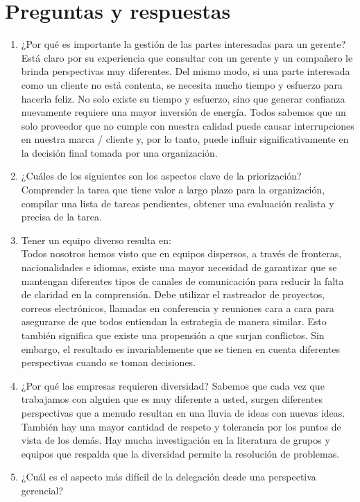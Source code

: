 \documentclass[10pt]{book}
\begin{document}
\section{Preguntas y respuestas}
\begin{enumerate}[\bfseries 1.]
\item ¿Por qué es importante la gestión de las partes interesadas para un gerente?\\
Está claro por su experiencia que consultar con un gerente y un compañero le brinda perspectivas muy diferentes. Del mismo modo, si una parte interesada como un cliente no está contenta, se necesita mucho tiempo y esfuerzo para hacerla feliz. No solo existe su tiempo y esfuerzo, sino que generar confianza nuevamente requiere una mayor inversión de energía. Todos sabemos que un solo proveedor que no cumple con nuestra calidad puede causar interrupciones en nuestra marca / cliente y, por lo tanto, puede influir significativamente en la decisión final tomada por una organización.
\item  ¿Cuáles de los siguientes son los aspectos clave de la priorización?\\
Comprender la tarea que tiene valor a largo plazo para la organización, compilar una lista de tareas pendientes, obtener una evaluación realista y precisa de la tarea.
\item Tener un equipo diverso resulta en:\\
Todos nosotros hemos visto que en equipos dispersos, a través de fronteras, nacionalidades e idiomas, existe una mayor necesidad de garantizar que se mantengan diferentes tipos de canales de comunicación para reducir la falta de claridad en la comprensión. Debe utilizar el rastreador de proyectos, correos electrónicos, llamadas en conferencia y reuniones cara a cara para asegurarse de que todos entiendan la estrategia de manera similar. Esto también significa que existe una propensión a que surjan conflictos. Sin embargo, el resultado es invariablemente que se tienen en cuenta diferentes perspectivas cuando se toman decisiones.
\item ¿Por qué las empresas requieren diversidad?
Sabemos que cada vez que trabajamos con alguien que es muy diferente a usted, surgen diferentes perspectivas que a menudo resultan en una lluvia de ideas con nuevas ideas. También hay una mayor cantidad de respeto y tolerancia por los puntos de vista de los demás. Hay mucha investigación en la literatura de grupos y equipos que respalda que la diversidad permite la resolución de problemas.
\item ¿Cuál es el aspecto más difícil de la delegación desde una perspectiva gerencial?\\

\end{enumerate}
\end{document}
